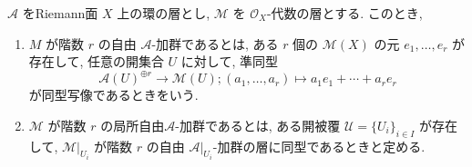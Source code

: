 \documentclass[a4paper,10pt,dvipdfmx]{jsreport}
\newenvironment{defi*}{\refstepcounter{theorem}\begin{itembox}[l]{\underline{Definition \arabic{chapter}.\arabic{section}.\arabic{theorem}.}}\vspace{-0.5zh}\ }{\end{itembox}}
\newcounter{theorem}[section]
\theoremstyle{definition}
\begin{document}
\begin{defi*}
    \(\mathcal{A}\) をRiemann面 \(X\) 上の環の層とし, \(\mathcal{M}\) を \(\mathcal{O}_X\)-代数の層とする. このとき,
    \begin{enumerate}
        \item \(M\) が階数 \(r\) の自由 \(\mathcal{A}\)-加群であるとは, ある \(r\) 個の \(\mathcal{M}(X)\) の元 \(e_1,\ldots ,e_r\) が存在して, 任意の開集合 \(U\) に対して, 準同型
        \[
            \mathcal{A}(U)^{\oplus r} \to \mathcal{M}(U);(a_1,\ldots,a_r) \mapsto a_1 e_1 +\cdots +a_r e_r
        \]
        が同型写像であるときをいう.

        \item \(\mathcal{M}\) が階数 \(r\) の局所自由\(\mathcal{A}\)-加群であるとは, ある開被覆 \(\mathcal{U}=\{U_i\}_{i \in I}\) が存在して, \(\mathcal{M}|_{U_i}\) が階数 \(r\) の自由 \(\mathcal{A}|_{U_i}\)-加群の層に同型であるときと定める.
    \end{enumerate}
\end{defi*}
\end{document}

